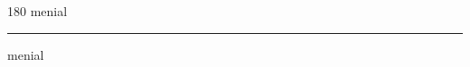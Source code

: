 
\begin{frame}
\begin{center}
\begin{turn}{180}
{\fontsize{2.5cm}{1em}\selectfont menial}
\end{turn}
\vspace{1em}\par  
\hrule
\vspace{1em}\par  
{\fontsize{2.5cm}{1em}\selectfont menial}
\end{center}
\end{frame}

